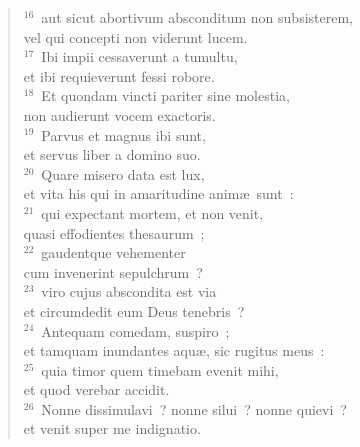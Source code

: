 \begin{flushleft}
\begin{verse}
${}^{16}$~aut sicut abortivum absconditum non subsisterem,\\ vel qui concepti non viderunt lucem.\\
${}^{17}$~Ibi impii cessaverunt a tumultu,\\ et ibi requieverunt fessi robore.\\
${}^{18}$~Et quondam vincti pariter sine molestia,\\ non audierunt vocem exactoris.\\
${}^{19}$~Parvus et magnus ibi sunt,\\ et servus liber a domino suo.\\
${}^{20}$~Quare misero data est lux,\\ et vita his qui in amaritudine anim\ae\ sunt~:\\
${}^{21}$~qui expectant mortem, et non venit,\\ quasi effodientes thesaurum~;\\
${}^{22}$~gaudentque vehementer\\ cum invenerint sepulchrum~?\\
${}^{23}$~viro cujus abscondita est via\\ et circumdedit eum Deus tenebris~?\\
${}^{24}$~Antequam comedam, suspiro~;\\ et tamquam inundantes aqu\ae , sic rugitus meus~:\\
${}^{25}$~quia timor quem timebam evenit mihi,\\ et quod verebar accidit.\\
${}^{26}$~Nonne dissimulavi~? nonne silui~? nonne quievi~?\\ et venit super me indignatio.\end{verse}\end{flushleft}



